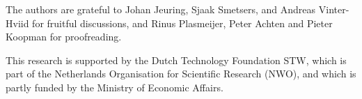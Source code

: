 
The authors are grateful to Johan Jeuring, Sjaak Smetsers, and Andreas Vinter-Hviid for fruitful discussions,
and Rinus Plasmeijer, Peter Achten and Pieter Koopman for proofreading.

This research is supported by the Dutch Technology Foundation STW, which is part
of the Netherlands Organisation for Scientific Research (NWO), and which is
partly funded by the Ministry of Economic Affairs.
